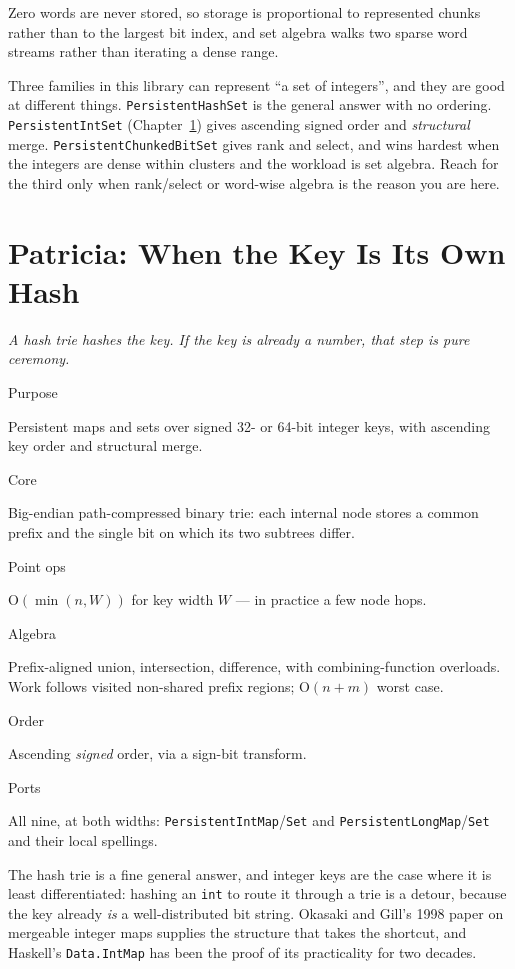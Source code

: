 \documentclass[11pt,twoside,openright]{book}
\newcommand{\code}[1]{\texorpdfstring{\textcolor{d7ink}{\texttt{#1}}}{#1}}
\newcommand{\bigoh}[1]{$\mathrm{O}(#1)$}
\newcommand{\motto}[1]{%
  \begingroup
  \vspace{-4pt}\hfill\begin{minipage}{0.80\textwidth}
    \raggedleft\itshape\color{d7slate}\small #1\par
  \end{minipage}\par\vspace{18pt}
  \endgroup}
\newcommand{\spec}[2]{%
  \par\noindent
  \parbox[t]{0.21\linewidth}{\raggedright\sffamily\bfseries\footnotesize
    \color{d7slate}\strut #1}%
  \hspace{9pt}%
  \parbox[t]{\dimexpr0.79\linewidth-9pt\relax}{\raggedright\strut #2}%
  \par\vspace{3.5pt}}
\newenvironment{specimen}[1][Specimen]
  {\begin{glancebox}[#1]\small\setlength{\parindent}{0pt}}
  {\end{glancebox}}
\begin{document}
Zero words are never stored, so storage is proportional to represented chunks
rather than to the largest bit index, and set algebra walks two sparse word
streams rather than iterating a dense range.

\begin{caveatbox}
Three families in this library can represent ``a set of integers'', and they are
good at different things. \code{PersistentHashSet} is the general answer with no
ordering. \code{PersistentIntSet} (Chapter~\ref{ch:patricia}) gives ascending
signed order and \emph{structural} merge. \code{PersistentChunkedBitSet} gives
rank and select, and wins hardest when the integers are dense within clusters
and the workload is set algebra. Reach for the third only when rank/select or
word-wise algebra is the reason you are here.
\end{caveatbox}

\chapter{Patricia: When the Key Is Its Own Hash}
\label{ch:patricia}

\motto{A hash trie hashes the key. If the key is already a number, that step is
pure ceremony.}

\begin{specimen}[Specimen --- Patricia integer maps and sets]
%
\spec{Purpose}{Persistent maps and sets over signed 32- or 64-bit integer keys, with ascending key order and structural merge.}
\spec{Core}{Big-endian path-compressed binary trie: each internal node stores a common prefix and the single bit on which its two subtrees differ.}
\spec{Point ops}{\bigoh{\min(n, W)} for key width $W$ --- in practice a few node hops.}
\spec{Algebra}{Prefix-aligned union, intersection, difference, with combining-function overloads. Work follows visited non-shared prefix regions; \bigoh{n+m} worst case.}
\spec{Order}{Ascending \emph{signed} order, via a sign-bit transform.}
\spec{Ports}{All nine, at both widths: \code{PersistentIntMap}/\code{Set} and \code{PersistentLongMap}/\code{Set} and their local spellings.}
\end{specimen}

\noindent
The hash trie is a fine general answer, and integer keys are the case where it
is least differentiated: hashing an \code{int} to route it through a trie is a
detour, because the key already \emph{is} a well-distributed bit string. Okasaki
and Gill's 1998 paper on mergeable integer maps supplies the structure that
takes the shortcut, and Haskell's \code{Data.IntMap} has been the proof of its
practicality for two decades.
\end{document}
